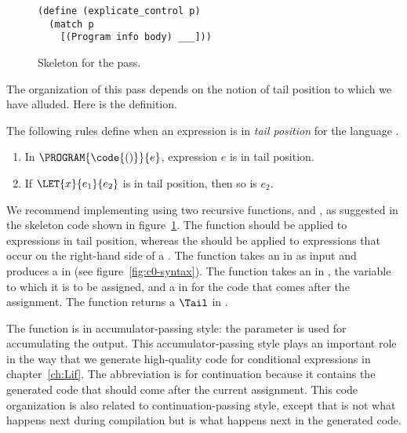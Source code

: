 \documentclass[7x10]{TimesAPriori_MIT}%
\numberwithin{theorem}{chapter}
\numberwithin{definition}{chapter}
\numberwithin{equation}{chapter}
\begin{document}
{\begin{figure}[tbp]
\begin{tcolorbox}[colback=white]
\begin{lstlisting}
(define (explicate_control p)
  (match p
    [(Program info body) ___]))
\end{lstlisting}
\end{tcolorbox}
\caption{Skeleton for the  pass.}
\label{fig:explicate-control-Lvar}
\end{figure}

The organization of this pass depends on the notion of tail position
to which we have alluded. Here is the definition.

\begin{definition}\normalfont
  The following rules define when an expression is in \emph{tail
  position} for the language \LangVar{}.
\begin{enumerate}
\item In $\PROGRAM{\code{()}}{e}$, expression $e$ is in tail position.
\item If $\LET{x}{e_1}{e_2}$ is in tail position, then so is $e_2$.
\end{enumerate}
\end{definition}

We recommend implementing  using two
recursive functions,  and
, as suggested in the skeleton code shown in
figure~\ref{fig:explicate-control-Lvar}.  The 
function should be applied to expressions in tail position, whereas the
 should be applied to expressions that occur on
the right-hand side of a .
%
The  function takes an \Exp{} in \LangVarANF{} as
input and produces a \Tail{} in \LangCVar{} (see
figure~\ref{fig:c0-syntax}).
%
The  function takes an \Exp{} in \LangVarANF{},
the variable to which it is to be assigned, and a \Tail{} in
\LangCVar{} for the code that comes after the assignment.  The
 function returns a $\Tail$ in \LangCVar{}.

The  function is in accumulator-passing style:
the  parameter is used for accumulating the output. This
accumulator-passing style plays an important role in the way that we
generate high-quality code for conditional expressions in
chapter~\ref{ch:Lif}.  The abbreviation  is for
continuation because it contains the generated code that should come
after the current assignment.  This code organization is also related
to continuation-passing style, except that  is not what
happens next during compilation but is what happens next in the
generated code.

}
\end{document}

